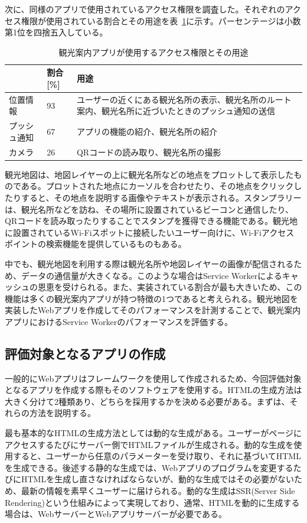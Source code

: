 次に、同様のアプリで使用されているアクセス権限を調査した。それぞれのアクセス権限が使用されている割合とその用途を表~\ref{table:観光案内アプリが使用するアクセス権限とその用途}に示す。パーセンテージは小数第1位を四捨五入している。

\begin{table}
  \caption{観光案内アプリが使用するアクセス権限とその用途}
  \label{table:観光案内アプリが使用するアクセス権限とその用途}
  \centering
  \begin{tabular}{|p{10em}|p{5em}|p{15em}|}
    \hline
    & 割合[\%] & 用途 \\ \hline
    位置情報 & 93 & ユーザーの近くにある観光名所の表示、観光名所のルート案内、観光名所に近づいたときのプッシュ通知の送信 \\ \hline
    プッシュ通知 & 67 & アプリの機能の紹介、観光名所の紹介 \\ \hline
    カメラ & 26 & QRコードの読み取り、観光名所の撮影 \\ \hline
  \end{tabular}
\end{table}
観光地図は、地図レイヤーの上に観光名所などの地点をプロットして表示したものである。プロットされた地点にカーソルを合わせたり、その地点をクリックしたりすると、その地点を説明する画像やテキストが表示される。スタンプラリーは、観光名所などを訪ね、その場所に設置されているビーコンと通信したり、QRコードを読み取ったりすることでスタンプを獲得できる機能である。観光地に設置されているWi-Fiスポットに接続したいユーザー向けに、Wi-Fiアクセスポイントの検索機能を提供しているものもある。

中でも、観光地図を利用する際は観光名所や地図レイヤーの画像が配信されるため、データの通信量が大きくなる。このような場合はService Workerによるキャッシュの恩恵を受けられる。また、実装されている割合が最も大きいため、この機能は多くの観光案内アプリが持つ特徴の1つであると考えられる。観光地図を実装したWebアプリを作成してそのパフォーマンスを計測することで、観光案内アプリにおけるService Workerのパフォーマンスを評価する。
\subsection{評価対象となるアプリの作成}
\label{subsubsection:評価対象となるアプリの作成}
一般的にWebアプリはフレームワークを使用して作成されるため、今回評価対象となるアプリを作成する際もそのソフトウェアを使用する。HTMLの生成方法は大きく分けて2種類あり、どちらを採用するかを決める必要がある。まずは、それらの方法を説明する。

最も基本的なHTMLの生成方法としては動的な生成がある。ユーザーがページにアクセスするたびにサーバー側でHTMLファイルが生成される。動的な生成を使用すると、ユーザーから任意のパラメーターを受け取り、それに基づいてHTMLを生成できる。後述する静的な生成では、Webアプリのプログラムを変更するたびにHTMLを生成し直さなければならないが、動的な生成ではその必要がないため、最新の情報を素早くユーザーに届けられる。動的な生成はSSR(Server Side Rendering)という仕組みによって実現しており、通常、HTMLを動的に生成する場合は、WebサーバーとWebアプリサーバーが必要である。

